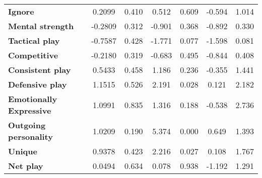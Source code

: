 \begin{center}
\begin{tabular}{lcccccc}
\textbf{Ignore}                 &       0.2099  &        0.410     &     0.512  &         0.609        &       -0.594    &        1.014     \\
\textbf{Mental strength}        &      -0.2809  &        0.312     &    -0.901  &         0.368        &       -0.892    &        0.330     \\
\textbf{Tactical play}          &      -0.7587  &        0.428     &    -1.771  &         0.077        &       -1.598    &        0.081     \\
\textbf{Competitive}            &      -0.2180  &        0.319     &    -0.683  &         0.495        &       -0.844    &        0.408     \\
\textbf{Consistent play}        &       0.5433  &        0.458     &     1.186  &         0.236        &       -0.355    &        1.441     \\
\textbf{Defensive play}         &       1.1515  &        0.526     &     2.191  &         0.028        &        0.121    &        2.182     \\
\textbf{Emotionally Expressive} &       1.0991  &        0.835     &     1.316  &         0.188        &       -0.538    &        2.736     \\
\textbf{Outgoing personality}   &       1.0209  &        0.190     &     5.374  &         0.000        &        0.649    &        1.393     \\
\textbf{Unique}                 &       0.9378  &        0.423     &     2.216  &         0.027        &        0.108    &        1.767     \\
\textbf{Net play}               &       0.0494  &        0.634     &     0.078  &         0.938        &       -1.192    &        1.291     \\
\bottomrule
\end{tabular}
\end{center}